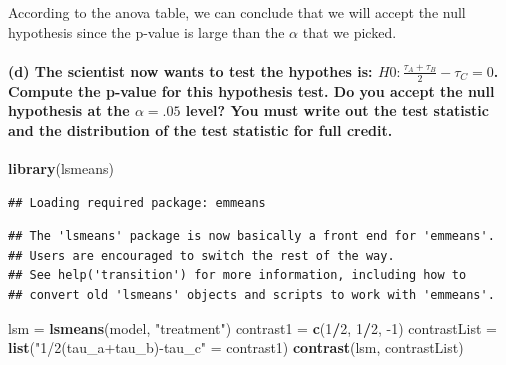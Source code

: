 \documentclass[
]{article}
\newenvironment{Shaded}{\begin{snugshade}}{\end{snugshade}}
\newcommand{\DecValTok}[1]{\textcolor[rgb]{0.00,0.00,0.81}{#1}}
\newcommand{\KeywordTok}[1]{\textcolor[rgb]{0.13,0.29,0.53}{\textbf{#1}}}
\newcommand{\NormalTok}[1]{#1}
\newcommand{\OperatorTok}[1]{\textcolor[rgb]{0.81,0.36,0.00}{\textbf{#1}}}
\newcommand{\StringTok}[1]{\textcolor[rgb]{0.31,0.60,0.02}{#1}}
\begin{document}
According to the anova table, we can conclude that we will accept the
null hypothesis since the p-value is large than the \(\alpha\) that we
picked.

\hypertarget{d-the-scientist-now-wants-to-test-the-hypothes-is-h0fracux3c4_aux3c4_b2ux3c4_c0.-compute-the-p-value-for-this-hypothesis-test.-do-you-accept-the-null-hypothesis-at-the-ux3b1.05-level-you-must-write-out-the-test-statistic-and-the-distribution-of-the-test-statistic-for-full-credit.}{%
\paragraph{\texorpdfstring{(d) The scientist now wants to test the
hypothes is: \(H0:\frac{τ_A+τ_B}2−τ_C=0\). Compute the p-value for this
hypothesis test. Do you accept the null hypothesis at the \(α=.05\)
level? You must write out the test statistic and the distribution of the
test statistic for full
credit.}{(d) The scientist now wants to test the hypothes is: H0:\textbackslash frac\{τ\_A+τ\_B\}2−τ\_C=0. Compute the p-value for this hypothesis test. Do you accept the null hypothesis at the α=.05 level? You must write out the test statistic and the distribution of the test statistic for full credit.}}\label{d-the-scientist-now-wants-to-test-the-hypothes-is-h0fracux3c4_aux3c4_b2ux3c4_c0.-compute-the-p-value-for-this-hypothesis-test.-do-you-accept-the-null-hypothesis-at-the-ux3b1.05-level-you-must-write-out-the-test-statistic-and-the-distribution-of-the-test-statistic-for-full-credit.}}

\begin{Shaded}
\begin{Highlighting}[]
\KeywordTok{library}\NormalTok{(lsmeans)}
\end{Highlighting}
\end{Shaded}

\begin{verbatim}
## Loading required package: emmeans
\end{verbatim}

\begin{verbatim}
## The 'lsmeans' package is now basically a front end for 'emmeans'.
## Users are encouraged to switch the rest of the way.
## See help('transition') for more information, including how to
## convert old 'lsmeans' objects and scripts to work with 'emmeans'.
\end{verbatim}

\begin{Shaded}
\begin{Highlighting}[]
\NormalTok{lsm =}\StringTok{ }\KeywordTok{lsmeans}\NormalTok{(model, }\StringTok{"treatment"}\NormalTok{)}
\NormalTok{contrast1 =}\StringTok{ }\KeywordTok{c}\NormalTok{(}\DecValTok{1}\OperatorTok{/}\DecValTok{2}\NormalTok{, }\DecValTok{1}\OperatorTok{/}\DecValTok{2}\NormalTok{, }\DecValTok{-1}\NormalTok{)}
\NormalTok{contrastList =}\StringTok{ }\KeywordTok{list}\NormalTok{(}\StringTok{"1/2(tau_a+tau_b)-tau_c"}\NormalTok{ =}\StringTok{ }\NormalTok{contrast1) }
\KeywordTok{contrast}\NormalTok{(lsm, contrastList)}
\end{Highlighting}
\end{Shaded}
\end{document}
